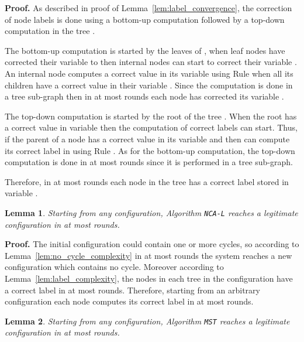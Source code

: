 \documentclass[11pt,a4paper]{article}
\newtheorem{lemma}{Lemma}
\newenvironment{proof}{\noindent \begin{rm}{\textbf{Proof.} }}{\hspace*{\fill}\par\end{rm}}
\newcommand{\MST}{\mbox{\tt MST}}
\newcommand{\LabA}{\mbox{\tt NCA-L}}
\begin{document}
\begin{proof}
As described in proof of Lemma~\ref{lem:label_convergence}, the correction of node labels is done using a bottom-up computation followed by a top-down computation in the tree .

The bottom-up computation is started by the leaves of , when leaf nodes  have corrected their variable  to  then internal nodes  can start to correct their variable . An internal node  computes a correct value in its variable  using Rule  when all its children  have a correct value in their variable . Since the computation is done in a tree sub-graph then in at most  rounds each node  has corrected its variable .

The top-down computation is started by the root of the tree . When the root  has a correct value in variable  then the computation of correct labels can start. Thus, if the parent of a node  has a correct value in its variable  and  then  can compute its correct label in  using Rule . As for the bottom-up computation, the top-down computation is done in at most  rounds since it is performed in a tree sub-graph.

Therefore, in at most  rounds each node  in the tree  has a correct label stored in variable .
\end{proof}

\begin{lemma}
\label{lem:label_total_complexity}
Starting from any configuration, Algorithm \LabA\/ reaches a legitimate configuration in at most  rounds.
\end{lemma}

\begin{proof}
The initial configuration  could contain one or more cycles, so according to Lemma~\ref{lem:no_cycle_complexity} in at most  rounds the system reaches a new configuration  which contains no cycle. Moreover according to Lemma~\ref{lem:label_complexity}, the nodes  in each tree  in the configuration  have a correct label in at most  rounds. Therefore, starting from an arbitrary configuration each node  computes its correct label in at most  rounds.
\end{proof}

\begin{lemma}
\label{lem:mst_complexity}
Starting from any configuration, Algorithm \MST\/ reaches a legitimate configuration in at most  rounds.
\end{lemma}
\end{document}
